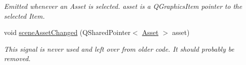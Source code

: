 \begin{DoxyCompactItemize}
\begin{DoxyCompactList}\small\item\em Emitted whenever an Asset is selected. asset is a Q\-Graphics\-Item pointer to the selected Item. \end{DoxyCompactList}\item 
\hypertarget{class_diagram_scene_a0e767e85d5cfa3b7142ecb81e763dfc9}{void \hyperlink{class_diagram_scene_a0e767e85d5cfa3b7142ecb81e763dfc9}{scene\-Asset\-Changed} (Q\-Shared\-Pointer$<$ \hyperlink{class_picto_1_1_asset}{Asset} $>$ asset)}\label{class_diagram_scene_a0e767e85d5cfa3b7142ecb81e763dfc9}

\begin{DoxyCompactList}\small\item\em This signal is never used and left over from older code. It should probably be removed. \end{DoxyCompactList}\end{DoxyCompactItemize}
